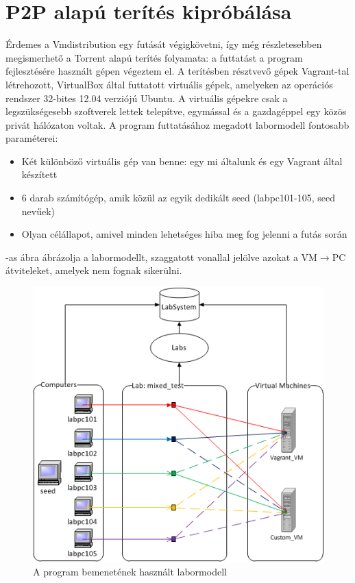 \section{P2P alapú terítés kipróbálása}

Érdemes a Vmdistribution egy futását végigkövetni, így még részletesebben megismerhető a Torrent alapú terítés folyamata:
a futtatást a program fejlesztésére használt gépen végeztem el. A terítésben résztvevő gépek Vagrant-tal létrehozott, VirtualBox által futtatott virtuális gépek, amelyeken az operációs rendszer 32-bites 12.04 verziójú Ubuntu. A virtuális gépekre csak a legszükségesebb szoftverek lettek telepítve, egymással és a gazdagéppel egy közös privát hálózaton voltak. A program futtatásához megadott labormodell fontosabb paraméterei:

\begin{itemize}
  \item Két különböző virtuális gép van benne: egy mi általunk és egy Vagrant által készített
  \item 6 darab számítógép, amik közül az egyik dedikált seed (labpc101-105, seed nevűek)
  \item Olyan célállapot, amivel minden lehetséges hiba meg fog jelenni a futás során
\end{itemize}

-as ábra ábrázolja a labormodellt, szaggatott vonallal jelölve azokat a VM$\rightarrow$PC átviteleket, amelyek nem fognak sikerülni.

\begin{figure}[h]
\centering
\includegraphics[width=130mm, keepaspectratio]{figures/testmodel.png}
\caption{A program bemenetének használt labormodell}
\label{fig:testmodel}
\end{figure}

